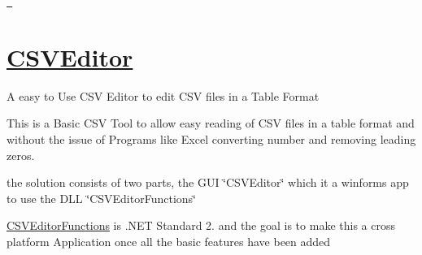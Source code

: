 \href{https://dev.azure.com/JTGithubCSVEditorBuild/CSVEditorBuild/_build/latest?definitionId=8&branchName=master}{\texttt{ }}

\section*{\mbox{\hyperlink{namespace_c_s_v_editor}{C\+S\+V\+Editor}}}

A easy to Use C\+SV Editor to edit C\+SV files in a Table Format

This is a Basic C\+SV Tool to allow easy reading of C\+SV files in a table format and without the issue of Programs like Excel converting number and removing leading zeros.

the solution consists of two parts, the G\+UI \char`\"{}\+C\+S\+V\+Editor\char`\"{} which it a winforms app to use the D\+LL \char`\"{}\+C\+S\+V\+Editor\+Functions\char`\"{}

\mbox{\hyperlink{namespace_c_s_v_editor_functions}{C\+S\+V\+Editor\+Functions}} is .N\+ET Standard 2. and the goal is to make this a cross platform Application once all the basic features have been added 